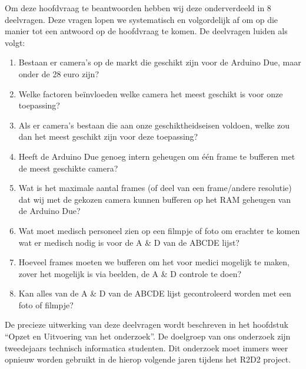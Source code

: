 \documentclass{article}
\begin{document}
Om deze hoofdvraag te beantwoorden hebben wij deze onderverdeeld in 8 deelvragen. Deze vragen lopen we systematisch en volgordelijk af om op die manier tot een antwoord op de hoofdvraag te komen. De deelvragen luiden als volgt:
\begin{enumerate}
	\item Bestaan er camera’s op de markt die geschikt zijn voor de Arduino Due, maar onder de 28 euro zijn?
	\item Welke factoren beïnvloeden welke camera het meest geschikt is voor onze toepassing? 
	\item Als er camera’s bestaan die aan onze geschiktheidseisen voldoen, welke zou dan het meest geschikt zijn voor deze toepassing? 
	\item Heeft de Arduino Due genoeg intern geheugen om één frame te bufferen met de meest geschikte camera? 
	\item Wat is het maximale aantal frames (of deel van een frame/andere resolutie) dat wij met de gekozen camera kunnen bufferen op het RAM geheugen van de Arduino Due? 
	\item Wat moet medisch personeel zien op een filmpje of foto om erachter te komen wat er medisch nodig is voor de A \& D van de ABCDE lijst?
	\item Hoeveel frames moeten we bufferen om het voor medici mogelijk te maken, zover het mogelijk is via beelden, de A \& D controle te doen? 
	\item Kan alles van de A \& D van de ABCDE lijst gecontroleerd worden met een foto of filmpje? 
\end{enumerate}
De precieze uitwerking van deze deelvragen wordt beschreven in het hoofdstuk “Opzet en Uitvoering van het onderzoek”.
De doelgroep van ons onderzoek zijn tweedejaars technisch informatica studenten. Dit onderzoek moet immers weer opnieuw worden gebruikt in de hierop volgende jaren tijdens het R2D2 project.
\end{document}
